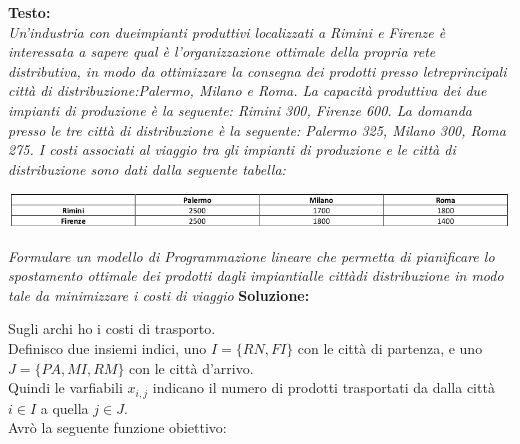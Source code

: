 \documentclass[a4paper,12pt, oneside]{book}
\begin{document}
\begin{esercizio}
  \textbf{Testo:}\\
  \textit{Un’industria con dueimpianti  produttivi  localizzati  a
    Rimini e Firenze è interessata a sapere qual è l’organizzazione
    ottimale della propria rete distributiva, in modo da ottimizzare
    la consegna dei prodotti presso letreprincipali città di
    distribuzione:Palermo, Milano  e Roma.  La  capacità  produttiva
    dei  due  impianti  di  produzione  è  la  seguente: Rimini 300,
    Firenze 600. La domanda presso le tre città di distribuzione è
    la seguente: Palermo 325, Milano 300, Roma 275. I costi associati
    al viaggio tra gli impianti di produzione e le città di
    distribuzione sono dati dalla seguente tabella:}
  \begin{center}
    \includegraphics[scale = 0.7]{img/es3.png}
  \end{center}
  \textit{Formulare un modello di Programmazione lineare che
    permetta di pianificare lo spostamento ottimale dei prodotti
    dagli impiantialle cittàdi distribuzione in modo tale da
    minimizzare i costi di viaggio}\newpage
  \textbf{Soluzione:}\\
  \begin{center}
\end{center}
Sugli archi ho i costi di trasporto.\\
Definisco due insiemi indici, uno $I=\{RN,FI\}$ con le città di
partenza, e uno $J=\{PA, MI, RM\}$ con le città d'arrivo. \\
Quindi le varfiabili $x_{i,j}$ indicano il numero di prodotti
trasportati da dalla città $i\in I$ a quella $j\in J$.\\
Avrò la seguente funzione obiettivo:

\end{esercizio}
\end{document}
